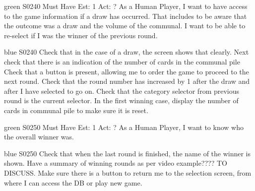 
\newpage

\begin{card}{green}
{S0240}
{Must Have}
{Est: 1}
{Act: ?}
As a Human Player, I want to have access to the game information if a draw has occurred. 
That includes to be aware that the outcome was a draw and the volume of the communal. 
I want to be able to re-select if I was the winner of the previous round. 
\end{card}

\begin{card}{blue}
{S0240}{}{}{}
Check that in the case of a draw, the screen shows that clearly. 
Next check that there is an indication of the number of cards in the communal pile Check that a button is present, allowing me to order the game to proceed to the next round. 
Check that the round number has increased by 1 after the draw and after I have selected to go on. 
Check that the category selector from previous round is the current selector. 
In the first winning case, display the number of cards in communal pile to make sure it is reset.
\end{card}


\newpage

\begin{card}{green}
{S0250}
{Must Have}
{Est: 1}
{Act: ?}
As a Human Player, I want to know who the overall winner was.
\end{card}

\begin{card}{blue}
{S0250}{}{}{}
Check that when the last round is finished, the name of the winner is shown. 
Have a summary of winning rounds as per video example???? TO DISCUSS.
Make sure there is a button to return me to the selection screen, from where I can access the DB or play new game.
\end{card}




